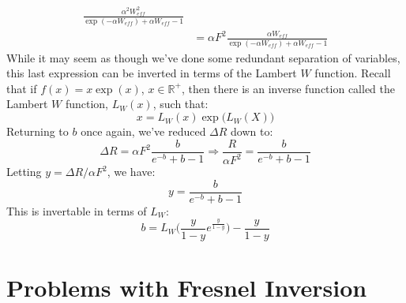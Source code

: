 \begin{definition}
\begin{subequations}
\begin{align}
                    \frac{\alpha^{2}W_{eff}^{2}}
                        {\exp(\minus\alpha{W}_{eff})
                         +\alpha{W}_{eff}-1}\\
                    &=\alpha{F}^{2}\frac{\alpha{W}_{eff}}
                        {\exp(\minus\alpha{W}_{eff})
                         +\alpha W_{eff}-1}
                \end{align}
            \end{subequations}
            While it may seem as though we've done some redundant
            separation of variables, this last expression can be
            inverted in terms of the Lambert $W$ function. Recall
            that if $f(x)=x\exp(x)$, $x\in\mathbb{R}^{+}$, then there
            is an inverse function called the Lambert $W$ function,
            $L_{W}(x)$, such that:
            \begin{equation}
                x=L_{W}(x)\exp\big(L_{W}(X)\big)
            \end{equation}
            Returning to $b$ once again, we've reduced
            $\Delta{R}$ down to:
            \begin{equation*}
                \Delta{R}=\alpha{F}^2
                    \frac{b}{e^{-b}+b-1}\Rightarrow
                    \frac{R}{\alpha F^2} = \frac{b}{e^{-b}+b-1}
            \end{equation*}
            Letting $y=\Delta{R}/\alpha{F}^{2}$, we have:
            \begin{equation}
                y=\frac{b}{e^{-b}+b-1}
            \end{equation}
            This is invertable in terms of $L_{W}$:
            \begin{equation*}
                b=L_{W}\bigg(\frac{y}{1-y}e^{\frac{y}{1-y}}\bigg) - \frac{y}{1-y}
            \end{equation*}
            \end{definition}
    \section{Problems with Fresnel Inversion}
